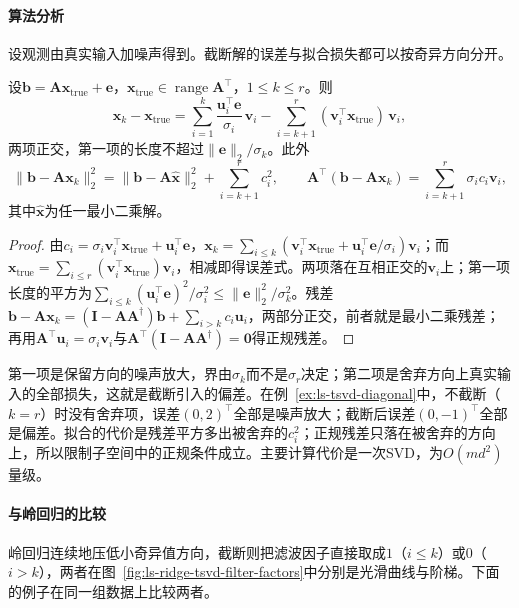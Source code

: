\paragraph{算法分析}
设观测由真实输入加噪声得到。截断解的误差与拟合损失都可以按奇异方向分开。

\begin{theorem}[截断SVD的误差分解]
\label{thm:ls-tsvd-error-decomposition}
设$\bm b=\bm A\bm x_{\mathrm{true}}+\bm e$，$\bm x_{\mathrm{true}}\in\operatorname{range}\bm A^\top$，$1\leq k\leq r$。则
\[
 \bm x_k-\bm x_{\mathrm{true}}=\sum_{i=1}^k\frac{\bm u_i^\top\bm e}{\sigma_i}\,\bm v_i-\sum_{i=k+1}^r(\bm v_i^\top\bm x_{\mathrm{true}})\,\bm v_i ,
\]
两项正交，第一项的长度不超过$\lVert\bm e\rVert_2/\sigma_k$。此外
\[
 \lVert\bm b-\bm A\bm x_k\rVert_2^2=\lVert\bm b-\bm A\hat{\bm x}\rVert_2^2+\sum_{i=k+1}^rc_i^2,\qquad
 \bm A^\top(\bm b-\bm A\bm x_k)=\sum_{i=k+1}^r\sigma_ic_i\bm v_i ,
\]
其中$\hat{\bm x}$为任一最小二乘解。
\end{theorem}
\begin{proof}
由$c_i=\sigma_i\bm v_i^\top\bm x_{\mathrm{true}}+\bm u_i^\top\bm e$，$\bm x_k=\sum_{i\leq k}(\bm v_i^\top\bm x_{\mathrm{true}}+\bm u_i^\top\bm e/\sigma_i)\bm v_i$；而$\bm x_{\mathrm{true}}=\sum_{i\leq r}(\bm v_i^\top\bm x_{\mathrm{true}})\bm v_i$，相减即得误差式。两项落在互相正交的$\bm v_i$上；第一项长度的平方为$\sum_{i\leq k}(\bm u_i^\top\bm e)^2/\sigma_i^2\leq\lVert\bm e\rVert_2^2/\sigma_k^2$。残差$\bm b-\bm A\bm x_k=(\bm I-\bm A\bm A^\dagger)\bm b+\sum_{i>k}c_i\bm u_i$，两部分正交，前者就是最小二乘残差；再用$\bm A^\top\bm u_i=\sigma_i\bm v_i$与$\bm A^\top(\bm I-\bm A\bm A^\dagger)=\bm0$得正规残差。
\end{proof}

第一项是保留方向的噪声放大，界由$\sigma_k$而不是$\sigma_r$决定；第二项是舍弃方向上真实输入的全部损失，这就是截断引入的偏差。在例~\ref{ex:ls-tsvd-diagonal}中，不截断（$k=r$）时没有舍弃项，误差$(0,2)^\top$全部是噪声放大；截断后误差$(0,-1)^\top$全部是偏差。拟合的代价是残差平方多出被舍弃的$c_i^2$；正规残差只落在被舍弃的方向上，所以限制子空间中的正规条件成立。主要计算代价是一次SVD，为$O(md^2)$量级。

\paragraph{与岭回归的比较}
岭回归连续地压低小奇异值方向，截断则把滤波因子直接取成$1$（$i\leq k$）或$0$（$i>k$），两者在图~\ref{fig:ls-ridge-tsvd-filter-factors}中分别是光滑曲线与阶梯。下面的例子在同一组数据上比较两者。

